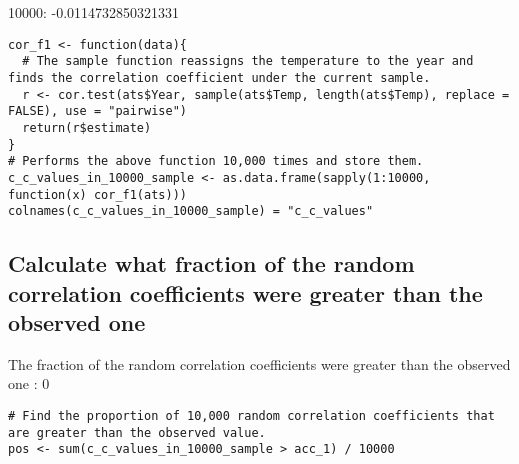 \documentclass[a4paper, 11pt]{article}
\begin{document}
10000: -0.0114732850321331

\begin{lstlisting}[style=Rstyle]
cor_f1 <- function(data){
  # The sample function reassigns the temperature to the year and finds the correlation coefficient under the current sample.
  r <- cor.test(ats$Year, sample(ats$Temp, length(ats$Temp), replace = FALSE), use = "pairwise")
  return(r$estimate)
}  
# Performs the above function 10,000 times and store them.
c_c_values_in_10000_sample <- as.data.frame(sapply(1:10000, function(x) cor_f1(ats)))
colnames(c_c_values_in_10000_sample) = "c_c_values"
\end{lstlisting}

\subsection{Calculate what fraction of the random correlation coefficients were greater than the observed one}

The fraction of the random correlation coefficients were greater than the observed one : 0

\begin{lstlisting}[style=Rstyle]
# Find the proportion of 10,000 random correlation coefficients that are greater than the observed value.
pos <- sum(c_c_values_in_10000_sample > acc_1) / 10000
\end{lstlisting}
\end{document}
